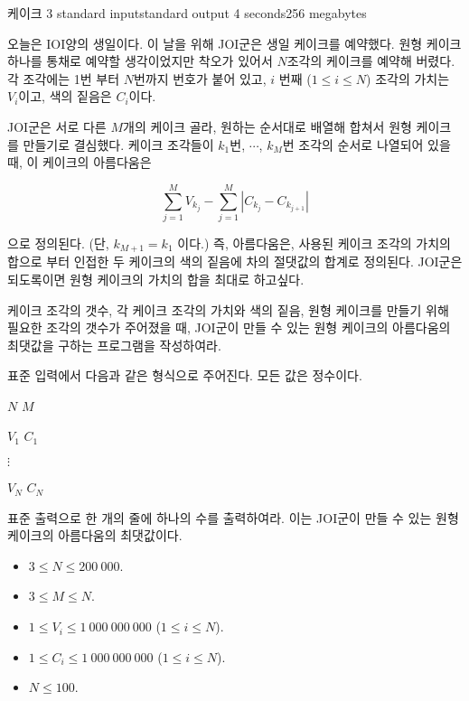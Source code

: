 \begin{problem}{케이크 3}
	{standard input}{standard output}
	{4 seconds}{256 megabytes}{}
	
	오늘은 IOI양의 생일이다. 이 날을 위해 JOI군은 생일 케이크를 예약했다. 원형 케이크 하나를 통채로 예약할 생각이었지만 착오가 있어서 $N$조각의 케이크를 예약해 버렸다. 각 조각에는 1번 부터 $N$번까지 번호가 붙어 있고, $i$ 번째 ($1 \le i \le N$) 조각의 가치는 $V_i$이고, 색의 짙음은 $C_i$이다.
	
	JOI군은 서로 다른 $M$개의 케이크 골라, 원하는 순서대로 배열해 합쳐서 원형 케이크를 만들기로 결심했다. 케이크 조각들이 $k_1$번, $\cdots$, $k_M$번 조각의 순서로 나열되어 있을 때, 이 케이크의 아름다움은 
	
	$$
	\sum_{j=1}^{M} {V_{k_j}} - \sum_{j=1}^{M} {\left| C_{k_j} - C_{k_{j+1}}\right|}
	$$
	
	으로 정의된다. (단, $k_{M+1} = k_1$ 이다.) 즉, 아름다움은, 사용된 케이크 조각의 가치의 합으로 부터 인접한 두 케이크의 색의 짙음에 차의 절댓값의 합계로 정의된다. JOI군은 되도록이면 원형 케이크의 가치의 합을 최대로 하고싶다.
	
	케이크 조각의 갯수, 각 케이크 조각의 가치와 색의 짙음, 원형 케이크를 만들기 위해 필요한 조각의 갯수가 주어졌을 때, JOI군이 만들 수 있는 원형 케이크의 아름다움의 최댓값을 구하는 프로그램을 작성하여라.
	
	\InputFile
	
	표준 입력에서 다음과 같은 형식으로 주어진다. 모든 값은 정수이다.
	
	$N$ $M$

	$V_1$ $C_1$
	
	$\vdots$
	
	$V_N$ $C_N$
	
	\OutputFile
	
	표준 출력으로 한 개의 줄에 하나의 수를 출력하여라. 이는 JOI군이 만들 수 있는 원형 케이크의 아름다움의 최댓값이다.
		
	\Constraints
	
	\begin{itemize}
		\item $3 \le N \le 200\ 000$.
		\item $3 \le M \le N$.
		\item $1 \le V_i \le 1\ 000\ 000\ 000$ ($1 \le i \le N$).
		\item $1 \le C_i \le 1\ 000\ 000\ 000$ ($1 \le i \le N$).
	\end{itemize}
	
	
	\begin{itemize}
		\item $N \le 100$.
	\end{itemize}



\end{problem}
